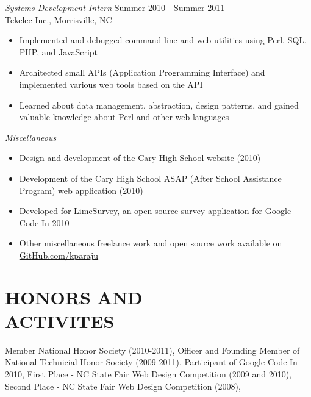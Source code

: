 \documentclass[margin]{res}
\begin{document}
\begin{resume}
                {\sl Systems Development Intern} \hfill Summer 2010 - Summer 2011 \\
                Tekelec Inc., Morrisville, NC
                \begin{itemize}  \itemsep -2pt %
                \item 
                  Implemented and debugged command line and web utilities using Perl, SQL, PHP, and JavaScript
                \item
                  Architected small APIs (Application Programming Interface) and implemented various web tools based on the API
                \item
                  Learned about data management, abstraction, design patterns, and gained valuable 
                  knowledge about Perl and other web languages
                \end{itemize}

                {\sl Miscellaneous }
                \begin{itemize}  \itemsep -2pt %
                \item 
                  Design and development of the \href{http://caryhs.wcpss.net/}{Cary High School website} (2010)
                \item
                  Development of the Cary High School ASAP (After School Assistance Program) web application (2010)
                \item
                  Developed for \href{http://www.limesurvey.org/}{LimeSurvey}, an open source survey application for Google Code-In 2010
                \item
                  Other miscellaneous freelance work and open source work available on \\
                  \href{https://github.com/kparaju}{GitHub.com/kparaju} 
                \end{itemize}


\section{HONORS AND \\ ACTIVITES}
            Member National Honor Society (2010-2011),
            Officer and Founding Member of National Technicial Honor Society (2009-2011),
            Participant of Google Code-In 2010, 
            First Place - NC State Fair Web Design Competition (2009 and 2010),
            Second Place - NC State Fair Web Design Competition (2008),
 

\end{resume}
\end{document}
